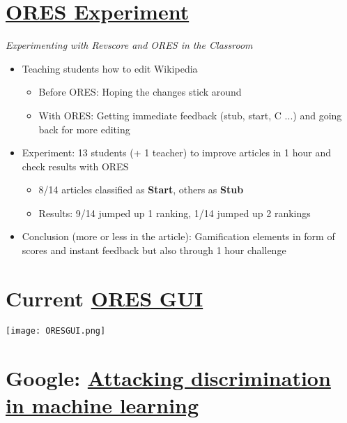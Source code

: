\documentclass[12pt,a4paper]{article}
\begin{document}
\section{\href{https://en.wikipedia.org/wiki/User:Fuzheado/ORES_experiment}{ORES Experiment}}
\textit{Experimenting with Revscore and ORES in the Classroom}
\begin{itemize}
\item Teaching students how to edit Wikipedia
\begin{itemize}
\item Before ORES: Hoping the changes stick around
\item With ORES: Getting immediate feedback (stub, start, C ...) and going back for more editing
\end{itemize}
\item Experiment: 13 students (+ 1 teacher) to improve articles in 1 hour and check results with ORES
\begin{itemize}
\item 8/14 articles classified as \textbf{Start}, others as \textbf{Stub}
\item Results: 9/14 jumped up 1 ranking, 1/14 jumped up 2 rankings
\end{itemize}
\item Conclusion (more or less in the article): Gamification elements in form of scores and instant feedback but also through 1 hour challenge
\end{itemize}
\section{Current \href{https://ores.wikimedia.org/ui/}{ORES GUI}}
\texttt{[image: ORESGUI.png]}

\section{Google: \href{https://research.google.com/bigpicture/attacking-discrimination-in-ml/}{Attacking discrimination in machine learning}}
\end{document}
